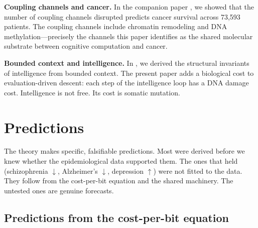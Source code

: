 \documentclass[11pt]{article}
\theoremstyle{definition}
\begin{document}
\textbf{Coupling channels and cancer.} In the companion paper
\cite{McCarthy2026e}, we showed that the number of coupling
channels disrupted predicts cancer survival across 73,593 patients.
The coupling channels include chromatin remodeling and DNA
methylation---precisely the channels this paper identifies as
the shared molecular substrate between cognitive computation
and cancer.

\textbf{Bounded context and intelligence.} In \cite{McCarthy2026_BCA},
we derived the structural invariants of intelligence from bounded
context. The present paper adds a biological cost to evaluation-driven
descent: each step of the intelligence loop has a DNA damage cost.
Intelligence is not free. Its cost is somatic mutation.

\section{Predictions}
\label{sec:predictions}

The theory makes specific, falsifiable predictions. Most were
derived before we knew whether the epidemiological data supported
them. The ones that held (schizophrenia $\downarrow$, Alzheimer's
$\downarrow$, depression $\uparrow$) were not fitted to the data.
They follow from the cost-per-bit equation and the shared machinery.
The untested ones are genuine forecasts.

\subsection{Predictions from the cost-per-bit equation}
\end{document}
